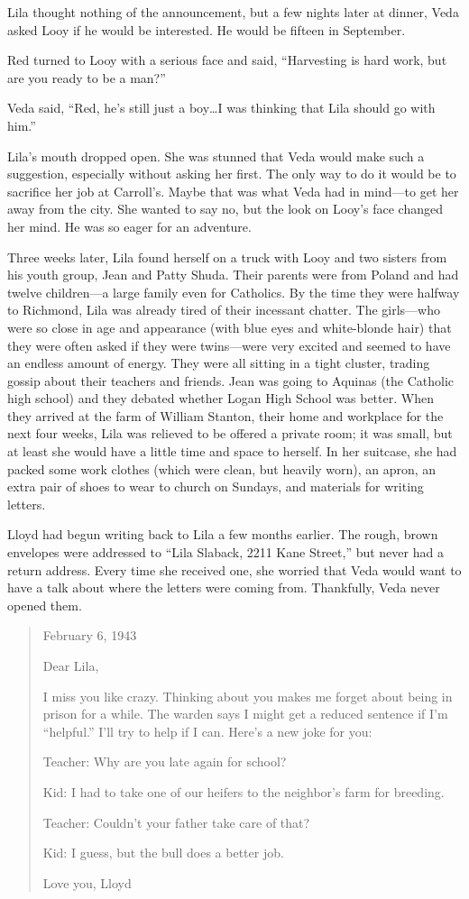 \documentclass[
  letterpaper,
]{book}
\begin{document}
Lila thought nothing of the announcement, but a few nights later at
dinner, Veda asked Looy if he would be interested. He would be fifteen
in September.

Red turned to Looy with a serious face and said, ``Harvesting is hard
work, but are you ready to be a man?''

Veda said, ``Red, he's still just a boy\ldots I was thinking that Lila
should go with him.''

Lila's mouth dropped open. She was stunned that Veda would make such a
suggestion, especially without asking her first. The only way to do it
would be to sacrifice her job at Carroll's. Maybe that was what Veda had
in mind---to get her away from the city. She wanted to say no, but the
look on Looy's face changed her mind. He was so eager for an adventure.

Three weeks later, Lila found herself on a truck with Looy and two
sisters from his youth group, Jean and Patty Shuda. Their parents were
from Poland and had twelve children---a large family even for Catholics.
By the time they were halfway to Richmond, Lila was already tired of
their incessant chatter. The girls---who were so close in age and
appearance (with blue eyes and white-blonde hair) that they were often
asked if they were twins---were very excited and seemed to have an
endless amount of energy. They were all sitting in a tight cluster,
trading gossip about their teachers and friends. Jean was going to
Aquinas (the Catholic high school) and they debated whether Logan High
School was better. When they arrived at the farm of William Stanton,
their home and workplace for the next four weeks, Lila was relieved to
be offered a private room; it was small, but at least she would have a
little time and space to herself. In her suitcase, she had packed some
work clothes (which were clean, but heavily worn), an apron, an extra
pair of shoes to wear to church on Sundays, and materials for writing
letters.

Lloyd had begun writing back to Lila a few months earlier. The rough,
brown envelopes were addressed to ``Lila Slaback, 2211 Kane Street,''
but never had a return address. Every time she received one, she worried
that Veda would want to have a talk about where the letters were coming
from. Thankfully, Veda never opened them.

\begin{quote}
February 6, 1943

Dear Lila,

I miss you like crazy. Thinking about you makes me forget about being in
prison for a while. The warden says I might get a reduced sentence if
I'm ``helpful.'' I'll try to help if I can. Here's a new joke for you:

Teacher: Why are you late again for school?

Kid: I had to take one of our heifers to the neighbor's farm for
breeding.

Teacher: Couldn't your father take care of that?

Kid: I guess, but the bull does a better job.

Love you, Lloyd
\end{quote}
\end{document}
